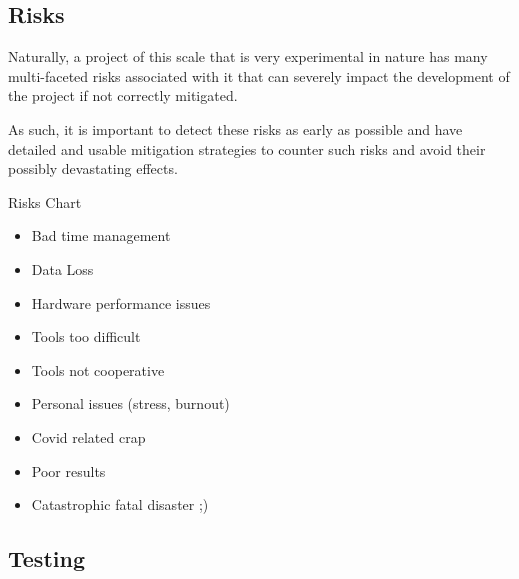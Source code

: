 \documentclass[12pt]{article}
\newcommand{\sentence}{} %
\begin{document}
    \pagebreak

    \subsection{Risks}\label{subsec:risks}

    \tab
    Naturally, a project of this scale that is very experimental in nature has many multi-faceted risks
    associated with it that can severely impact the development of the project if not correctly mitigated.
    \sentence
    As such, it is important to detect these risks as early as possible and have detailed and usable mitigation
    strategies to counter such risks and avoid their possibly devastating effects.
    \sentence

    \pagebreak
    \thispagestyle{empty}
    \begin{landscape}
        \begin{center}
            \huge{Risks Chart}
            \normalsize
            \begin{itemize}
                \item Bad time management
                \item Data Loss
                \item Hardware performance issues
                \item Tools too difficult
                \item Tools not cooperative
                \item Personal issues (stress, burnout)
                \item Covid related crap
                \item Poor results
                \item Catastrophic fatal disaster ;)
            \end{itemize}
        \end{center}
    \end{landscape}
    \pagebreak

    \subsection{Testing}\label{subsec:testing}
\end{document}
